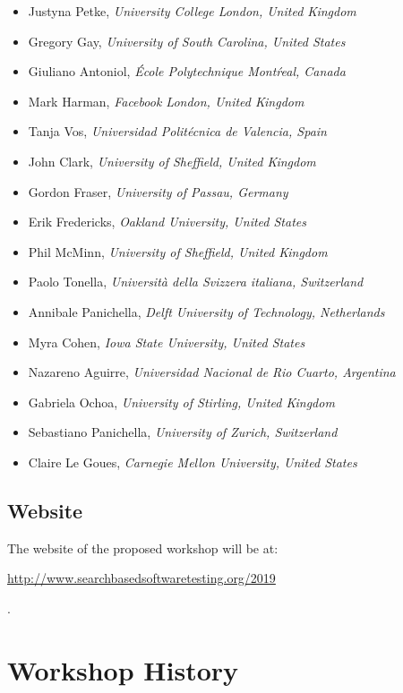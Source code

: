 \documentclass[10pt,conference]{IEEEtran}
\begin{document}
{\small
\begin{itemize}[leftmargin=*]\setlength{\itemsep}{0cm}
\item Justyna Petke, {\it University College London, United Kingdom}
\item Gregory Gay, {\it University of South Carolina, United States}
\item Giuliano Antoniol, {\it \'Ecole Polytechnique Mont\'real, Canada}
\item Mark Harman, {\it Facebook London, United Kingdom}
\item Tanja Vos, {\it Universidad Polit\'ecnica de Valencia, Spain}
\item John Clark, {\it University of Sheffield, United Kingdom}
\item Gordon Fraser, {\it University of Passau, Germany}
\item Erik Fredericks, {\it Oakland University, United States}
\item Phil McMinn, {\it University of Sheffield, United Kingdom}
\item Paolo Tonella, {\it Universit\`a della Svizzera italiana, Switzerland}
\item Annibale Panichella, {\it Delft University of Technology, Netherlands}
\item Myra Cohen, {\it Iowa State University, United States}
\item Nazareno Aguirre, {\it Universidad Nacional de Rio Cuarto, Argentina}
\item Gabriela Ochoa, {\it University of Stirling, United Kingdom}
\item Sebastiano Panichella, {\it University of Zurich, Switzerland}
\item Claire Le Goues, {\it Carnegie Mellon University, United States}
\end{itemize}
}
 
\subsection{Website}

The website of the proposed workshop will be at:\\\centerline{\url{http://www.searchbasedsoftwaretesting.org/2019}}.

\section{Workshop History}
\end{document}
